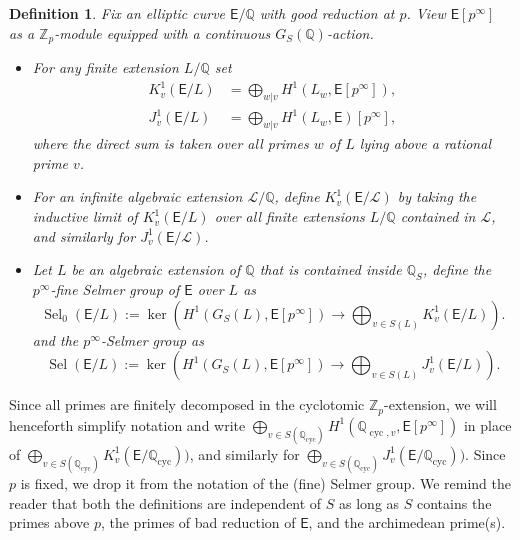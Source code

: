 \documentclass{amsart}
\newtheorem{definition}[theorem]{Definition}
\numberwithin{equation}{section}
\theoremstyle{remark}
\newcommand{\EC}{\mathsf{E}}
\newcommand{\cL}{\mathcal{L}}
\newcommand{\Zp}{\mathbb{Z}_p}
\newcommand{\Q}{\mathbb{Q}}
\newcommand{\cyc}{\operatorname{{cyc}}}
\newcommand{\Sel}{\operatorname{Sel}}
\theoremstyle{plain} %
\begin{document}
\begin{definition}
Fix an elliptic curve $\EC/\Q$ with good reduction at $p$.
View $\EC[p^\infty]$ as a $\Zp$-module equipped with a continuous $G_S(\Q)$-action.
\begin{itemize}
 \item[\textup{(}i\textup{)}] For any finite extension $L/\Q$ set
\begin{align*}
K^1_v\left(\EC/L\right) &= \bigoplus_{w|v} H^1\left(L_w, \EC[p^\infty]\right),\\
J^1_v\left(\EC/L\right) &= \bigoplus_{w|v} H^1\left(L_w, \EC\right)[p^\infty],
\end{align*}
where the direct sum is taken over all primes $w$ of $L$ lying above a rational prime $v$.
\item[\textup{(}ii\textup{)}]For an infinite algebraic extension $\cL/\Q$, define $K_v^1\left(\EC/\cL\right)$ by taking the inductive limit of $K_v^1\left(\EC/L\right)$ over all finite extensions $L/\Q$ contained in $\cL$, and similarly for $J_v^1(\EC/\cL)$.
\item[\textup{(}iii\textup{)}]Let $L$ be an algebraic extension of $\Q$ that is contained inside $\Q_S$, define the \emph{$p^\infty$-fine Selmer group} of $\EC$ over $L$ as
\[
\Sel_0(\EC/L):=\ker\left(H^1(G_S(L),\EC[p^\infty])\longrightarrow\bigoplus_{v\in S(L)} K^1_v(\EC/L)\right).
\]
and the \emph{$p^\infty$-Selmer group} as
\[
\Sel(\EC/L):=\ker\left(H^1(G_S(L),\EC[p^\infty])\longrightarrow\bigoplus_{v\in S(L)} J^1_v(\EC/L)\right).
\]
\end{itemize}
\end{definition}
\noindent Since all primes are finitely decomposed in the cyclotomic $\Zp$-extension, we will henceforth simplify notation and write $\bigoplus_{v\in S(\Q_{\cyc})} H^1\left(\Q_{\cyc,v},\EC[p^\infty]\right)$ in place of $\bigoplus_{v\in S(\Q_{\cyc})} K^1_v(\EC/\Q_{\cyc}))$, and similarly for $\bigoplus_{v\in S(\Q_{\cyc})} J^1_v(\EC/\Q_{\cyc}))$.
Since $p$ is fixed, we drop it from the notation of the (fine) Selmer group.
We remind the reader that both the definitions are independent of $S$ as long as $S$ contains the primes above $p$, the primes of bad reduction of $\EC$, and the archimedean prime(s).
\end{document}
